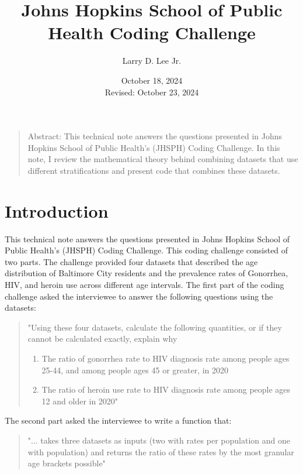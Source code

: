 \documentclass[]{article}
\title{Johns Hopkins School of Public Health Coding Challenge}
\author{Larry D. Lee Jr.}
\date{October 18, 2024\\Revised: October 23, 2024}
\begin{document}
\maketitle


\begin{quote}
Abstract: This technical note answers the questions presented in Johns
Hopkins School of Public Health's (JHSPH) Coding Challenge. In this
note, I review the mathematical theory behind combining datasets that
use different stratifications and present code that combines these
datasets.
\end{quote}

\hypertarget{introduction}{%
\section{Introduction}\label{introduction}}

This technical note answers the questions presented in Johns Hopkins
School of Public Health's (JHSPH) Coding Challenge. This coding
challenge consisted of two parts. The challenge provided four datasets
that described the age distribution of Baltimore City residents and the
prevalence rates of Gonorrhea, HIV, and heroin use across different age
intervals. The first part of the coding challenge asked the interviewee
to answer the following questions using the datasets:

\begin{quote}
"Using these four datasets, calculate the following quantities, or if
they cannot be calculated exactly, explain why

\begin{enumerate}
\def\labelenumi{\arabic{enumi}.}
\item
  The ratio of gonorrhea rate to HIV diagnosis rate among people ages
  25-44, and among people ages 45 or greater, in 2020
\item
  The ratio of heroin use rate to HIV diagnosis rate among people ages
  12 and older in 2020"
\end{enumerate}
\end{quote}

The second part asked the interviewee to write a function that:

\begin{quote}
"... takes three datasets as inputs (two with rates per population and
one with population) and returns the ratio of these rates by the most
granular age brackets possible"
\end{quote}
\end{document}

